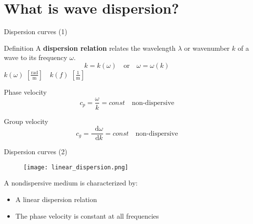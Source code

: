 \documentclass[10pt,aspectratio=169]{beamer} %
\DeclareRobustCommand*{\drv}{\mathop{}\!\mathrm{d}}
\begin{document}
\section{What is wave dispersion?}
\begin{frame}{Dispersion curves (1)}
	\begin{alertblock}{Definition}
		A \textbf{dispersion relation} relates the wavelength $\lambda$ or wavenumber $k$ of a wave to its frequency $\omega$.\\
		\begin{equation*}
		\boxed{k=k(\omega)} \quad \textrm{or} \quad \boxed{\omega = \omega(k)}
		\end{equation*}
		\vspace{10pt}
		$k(\omega)$ $[\frac{\mathrm{rad}}{\mathrm{m}}] \quad k(f)$ $[\frac{1}{\mathrm{m}}]$
	\end{alertblock}
	\begin{block}{Phase velocity}
		\begin{equation*}
		c_p = \frac{\omega}{k} = const\quad \textrm{non-dispersive}
		\end{equation*}
	\end{block}
	\begin{block}{Group velocity}
		\begin{equation*}
		c_g = \frac{\drv \omega}{\drv k} = const \quad \textrm{non-dispersive}
		\end{equation*}
	\end{block}
\end{frame}
\begin{frame}{Dispersion curves (2)}
	\begin{figure}
		\texttt{[image: linear\_dispersion.png]}
	\end{figure}
A nondispersive medium is characterized by:
	\begin{itemize}
	\item A linear dispersion relation
	\item The phase velocity is constant at all frequencies
	\end{itemize}
\end{frame}
\end{document}
